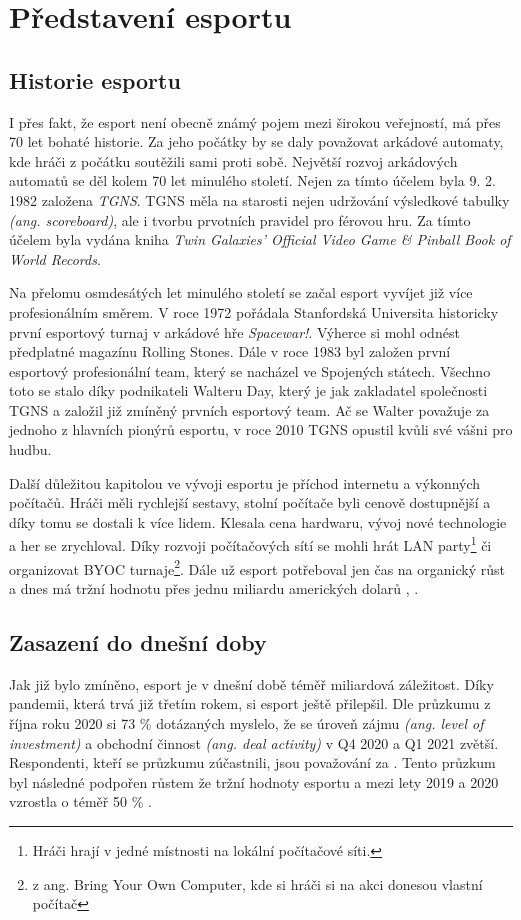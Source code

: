 \chapter{Představení esportu}
\section{Historie esportu}
I přes fakt, že esport není obecně známý pojem mezi širokou veřejností, má přes 70 let bohaté historie. Za jeho počátky by se
daly považovat arkádové automaty, kde hráči z počátku soutěžili sami proti sobě. Největší rozvoj arkádových automatů se děl kolem 70 let minulého 
století. Nejen za tímto účelem byla 9. 2. 1982 založena \textit{\ac{TGNS}}. \ac{TGNS} měla na starosti nejen udržování výsledkové tabulky \textit{(ang. scoreboard)},
ale i tvorbu prvotních pravidel pro férovou hru. Za tímto účelem byla vydána kniha \textit{Twin Galaxies' Official Video Game \& Pinball Book of World Records}.

Na přelomu osmdesátých let minulého století se začal esport vyvíjet již více profesionálním směrem. V roce 1972 pořádala Stanfordská Universita historicky první
esportový turnaj v arkádové hře \textit{Spacewar!}. Výherce si mohl odnést předplatné magazínu Rolling Stones. Dále v roce 1983 byl založen první esportový profesionální team,
který se nacházel ve Spojených státech. Všechno toto se stalo díky podnikateli Walteru Day, který je jak zakladatel společnosti \ac{TGNS} a založil již zmíněný
prvních esportový team. Ač se Walter považuje za jednoho z hlavních pionýrů esportu, v roce 2010 \ac{TGNS} opustil kvůli své vášni pro hudbu.

Další důležitou kapitolou ve vývoji esportu je příchod internetu a výkonných počítačů. Hráči měli rychlejší sestavy, stolní počítače byli cenově dostupnější a díky tomu
se dostali k více lidem. Klesala cena hardwaru, vývoj nové technologie a her se zrychloval. Díky rozvoji počítačových sítí se mohli hrát LAN party\footnote{Hráči hrají v jedné
místnosti na lokální počítačové síti.} či organizovat BYOC turnaje\footnote{z ang. Bring Your Own Computer, kde si hráči si na akci donesou vlastní počítač}. Dále už esport 
potřeboval jen čas na organický růst a dnes má tržní hodnotu přes jednu miliardu amerických dolarů \cite{Gough2021}, \cite{Larch2019}.

\section{Zasazení do dnešní doby}
Jak již bylo zmíněno, esport je v dnešní době téměř miliardová záležitost. Díky pandemii, která trvá již třetím rokem, si esport ještě přilepšil. Dle průzkumu \cite{Gough2021a}
z října roku 2020 si 73 \% dotázaných myslelo, že se úroveň zájmu \textit{(ang. level of investment)} a obchodní činnost \textit{(ang. deal activity)} v Q4 2020 a Q1 2021
zvětší. Respondenti, kteří se průzkumu zúčastnili, jsou považování za . Tento průzkum byl následné podpořen růstem že tržní hodnoty esportu a mezi lety 2019 a 2020
vzrostla o téměř 50 \% \cite{Gough2021}.


